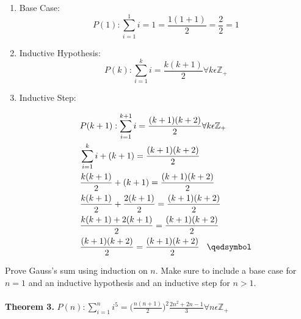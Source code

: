\documentclass[12pt]{article}
\begin{document}
\begin{enumerate}
\item Base Case:\\
\[P(1):\sum\limits_{i = 1}^{1} i = 1  = \frac{1(1+1)}{2} = \frac{2}{2} = 1\]
\item Inductive Hypothesis:
\[P(k):\sum\limits_{i = 1}^{k} i = \frac{k(k + 1)}{2} \forall k \epsilon \mathbb{Z}_+\]
\item Inductive Step:

\begin{align}
&P(k+1):\sum\limits_{i = 1}^{k+1} i = \frac{(k + 1)(k+2)}{2} \forall k \epsilon \mathbb{Z}_+\\
&\sum\limits_{i = 1}^{k} i + (k + 1)= \frac{(k + 1)(k+2)}{2}\\
&\frac{k(k+1)}{2} + (k+1)= \frac{(k + 1)(k+2)}{2}\\
&\frac{k(k+1)}{2} + \frac{2(k+1)}{2}= \frac{(k + 1)(k+2)}{2}\\
&\frac{k(k+1)+ 2(k+1)}{2}= \frac{(k + 1)(k+2)}{2}\\
&\frac{(k + 1)(k+2)}{2}= \frac{(k + 1)(k+2)}{2} \hspace{0.3cm}\qedsymbol
\end{align}
\end{enumerate}
\noindent Prove Gauss’s sum using induction on \begin{math}n\end{math}. Make sure to include a base case for \begin{math} n = 1\end{math} and an inductive hypothesis and an inductive step for \begin{math}n > 1\end{math}.\\\\
\noindent \textbf{Theorem 3.}
\begin{math}P(n):\sum\limits_{i = 1}^{n} i^5 = \big(\frac{n(n + 1)}{2}\big)^2\frac{2n^2+2n-1}{3} \forall n \epsilon \mathbb{Z}_+  \end{math}
\end{document}
